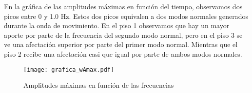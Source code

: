 \documentclass[11pt,letterpaper]{exam}
\begin{document}
En la gráfica de las amplitudes máximas en función del tiempo, observamos dos picos entre 0 y 1.0 Hz. Estos dos picos equivalen a dos modos normales generados durante la onda de movimiento. En el piso 1 observamos que hay un mayor aporte por parte de la frecuencia del segundo modo normal, pero en el piso 3 se ve una afectación superior por parte del primer modo normal. Mientras que el piso 2 recibe una afectación casi que igual por parte de ambos modos normales. \\
\begin{figure}[H]
\centering
\texttt{[image: grafica\_wAmax.pdf]}
\caption{Amplitudes máximas en función de las frecuencias}
\label{fig8}
\end{figure}
\end{document}
